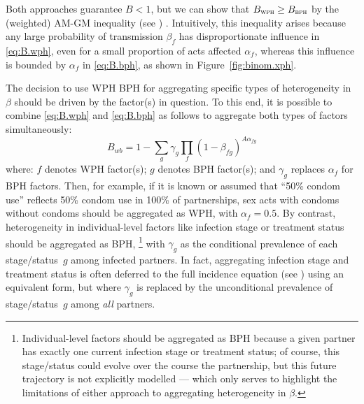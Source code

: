 Both approaches guarantee $B < 1$,
but we can show that $B_{\textsc{wph}} \ge B_{\textsc{bph}}$
by the (weighted) AM-GM inequality (see ) \cite{Aldaz2009}.
Intuitively, this inequality arises because
any large probability of transmission $\beta_f$
has disproportionate influence in \eqref{eq:B.wph},
even for a small proportion of acts affected $\alpha_f$,
whereas this influence is bounded by $\alpha_f$ in \eqref{eq:B.bph},
as shown in Figure~\ref{fig:binom.xph}.
\par
The decision to use WPH \vs BPH for aggregating specific types of heterogeneity in $\beta$
should be driven by the factor(s) in question.
To this end, it is possible to combine \eqref{eq:B.wph} and \eqref{eq:B.bph} as follows
to aggregate both types of factors simultaneously:
\begin{equation}\label{eq:B.xph}
  B_{wb} = 1 - \sum_g \gamma_g \prod_f {(1 - \beta_{fg})}^{A\alpha_{fg}}
\end{equation} where:
$f$ denotes WPH factor(s);
$g$ denotes BPH factor(s); and
$\gamma_g$ replaces $\alpha_f$ for BPH factors.
Then, for example, if it is known or assumed that
``50\% condom use'' reflects 50\% condom use in 100\% of partnerships,
sex acts with condoms \vs without condoms
should be aggregated as WPH, with $\alpha_f = 0.5$.
By contrast, heterogeneity in individual-level factors like infection stage or treatment status
should be aggregated as BPH,%
\footnote{\label{foot:xph.future}
  Individual-level factors should be aggregated as BPH because
  a given partner has exactly one current infection stage or treatment status;
  of course, this stage/status could evolve over the course the partnership,
  but this future trajectory is not explicitly modelled
  --- which only serves to highlight the limitations of
  either approach to aggregating heterogeneity in $\beta$.}
with $\gamma_g$ as the conditional prevalence of each stage/status~$g$ among infected partners.
In fact, aggregating infection stage and treatment status is often deferred to
the full incidence equation (see ) using an equivalent form,
but where $\gamma_g$ is replaced by
the unconditional prevalence of stage/status~$g$ among \emph{all} partners.
